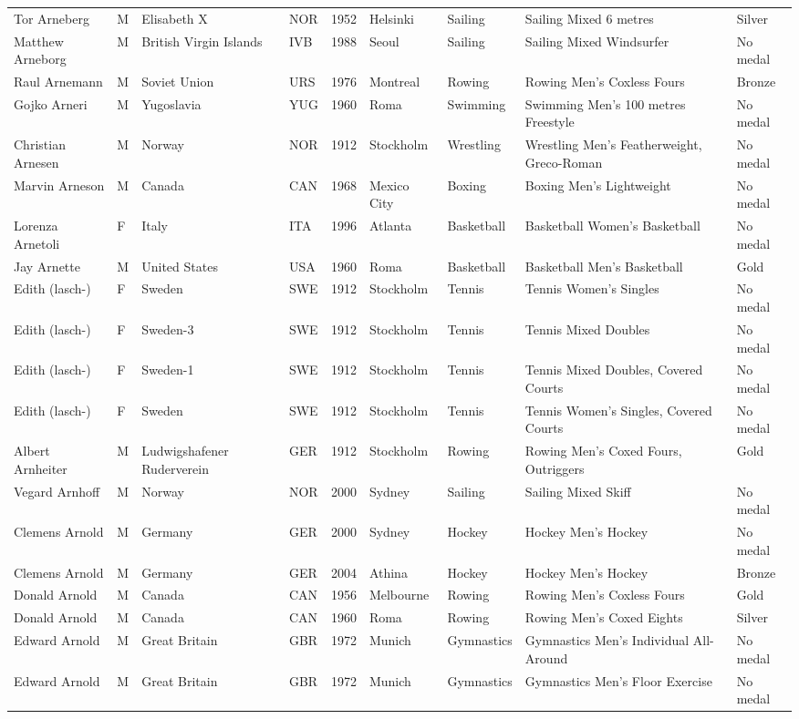 \documentclass{article}%
\begin{document}
\begin{longtable}{l l l l l l l l l}
Tor Arneberg&M&Elisabeth X&NOR&1952&Helsinki&Sailing&Sailing Mixed 6 metres&Silver\\%
Matthew Arneborg&M&British Virgin Islands&IVB&1988&Seoul&Sailing&Sailing Mixed Windsurfer&No medal\\%
Raul Arnemann&M&Soviet Union&URS&1976&Montreal&Rowing&Rowing Men's Coxless Fours&Bronze\\%
Gojko Arneri&M&Yugoslavia&YUG&1960&Roma&Swimming&Swimming Men's 100 metres Freestyle&No medal\\%
Christian Arnesen&M&Norway&NOR&1912&Stockholm&Wrestling&Wrestling Men's Featherweight, Greco{-}Roman&No medal\\%
Marvin Arneson&M&Canada&CAN&1968&Mexico City&Boxing&Boxing Men's Lightweight&No medal\\%
Lorenza Arnetoli&F&Italy&ITA&1996&Atlanta&Basketball&Basketball Women's Basketball&No medal\\%
Jay Arnette&M&United States&USA&1960&Roma&Basketball&Basketball Men's Basketball&Gold\\%
Edith (lasch{-})&F&Sweden&SWE&1912&Stockholm&Tennis&Tennis Women's Singles&No medal\\%
Edith (lasch{-})&F&Sweden{-}3&SWE&1912&Stockholm&Tennis&Tennis Mixed Doubles&No medal\\%
Edith (lasch{-})&F&Sweden{-}1&SWE&1912&Stockholm&Tennis&Tennis Mixed Doubles, Covered Courts&No medal\\%
Edith (lasch{-})&F&Sweden&SWE&1912&Stockholm&Tennis&Tennis Women's Singles, Covered Courts&No medal\\%
Albert Arnheiter&M&Ludwigshafener Ruderverein&GER&1912&Stockholm&Rowing&Rowing Men's Coxed Fours, Outriggers&Gold\\%
Vegard Arnhoff&M&Norway&NOR&2000&Sydney&Sailing&Sailing Mixed Skiff&No medal\\%
Clemens Arnold&M&Germany&GER&2000&Sydney&Hockey&Hockey Men's Hockey&No medal\\%
Clemens Arnold&M&Germany&GER&2004&Athina&Hockey&Hockey Men's Hockey&Bronze\\%
Donald Arnold&M&Canada&CAN&1956&Melbourne&Rowing&Rowing Men's Coxless Fours&Gold\\%
Donald Arnold&M&Canada&CAN&1960&Roma&Rowing&Rowing Men's Coxed Eights&Silver\\%
Edward Arnold&M&Great Britain&GBR&1972&Munich&Gymnastics&Gymnastics Men's Individual All{-}Around&No medal\\%
Edward Arnold&M&Great Britain&GBR&1972&Munich&Gymnastics&Gymnastics Men's Floor Exercise&No medal\\%

\end{longtable}
\end{document}
